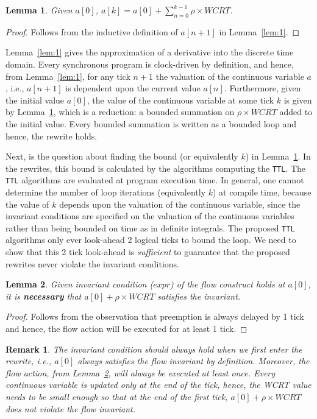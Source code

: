 \documentclass[10pt,journal,cspaper,compsoc]{IEEEtran}
\newtheorem{lem}{Lemma}
\newtheorem*{rem}{Remark}
\begin{document}
\begin{lem}
 Given $a[0]$, $a[k] = a[0] + \sum_{n=0}^{k-1} \rho \times WCRT$. 
 \label{lem:2}
\end{lem}

\begin{proof}
  Follows from the inductive definition of \mbox{$a[n+1]$} in
  Lemma~\ref{lem:1}.
\end{proof}

Lemma~\ref{lem:1} gives the approximation of a derivative into the
discrete time domain. Every synchronous program is clock-driven by
definition, and hence, from Lemma~\ref{lem:1}, for any tick $n+1$ the
valuation of the continuous variable $a$, i.e., $a[n+1]$ is dependent
upon the current value $a[n]$. Furthermore, given the initial value
$a[0]$, the value of the continuous variable at some tick $k$ is given
by Lemma~\ref{lem:2}, which is a reduction: a bounded summation on $\rho
\times WCRT$ added to the initial value. Every bounded summation is
written as a bounded loop and hence, the rewrite holds.

Next, is the question about finding the bound (or equivalently $k$) in
Lemma~\ref{lem:2}. In the rewrites, this bound is calculated by the
algorithms computing the \texttt{TTL}. The \texttt{TTL} algorithms are
evaluated at program execution time. In general, one cannot determine
the number of loop iterations (equivalently $k$) at compile time,
because the value of $k$ depends upon the valuation of the continuous
variable, since the invariant conditions are specified on the valuation
of the continuous variables rather than being bounded on time as in
definite integrals. The proposed \texttt{TTL} algorithms only ever
look-ahead 2 logical ticks to bound the loop. We need to show that this
2 tick look-ahead is \textit{sufficient} to guarantee that the proposed
rewrites never violate the invariant conditions.

\begin{lem}
  Given invariant condition ($expr$) of the flow construct holds at
  $a[0]$, it is \textbf{necessary} that $a[0] + \rho \times WCRT$
  satisfies the invariant.
  \label{lem:3}
\end{lem}

\begin{proof}
  Follows from the observation that preemption is always delayed by 1
  tick and hence, the flow action will be executed for at least 1 tick.
\end{proof}

\begin{rem}
  The invariant condition should always hold when we first enter the
  rewrite, i.e., $a[0]$ always satisfies the flow invariant by
  definition. Moreover, the flow action, from Lemma~\ref{lem:3}, will
  always be executed at least once. Every continuous variable is updated
  only at the end of the tick, hence, the WCRT value needs to be small
  enough so that at the end of the first tick, $a[0] + \rho \times WCRT$
  does not violate the flow invariant.
\end{rem}
\end{document}
